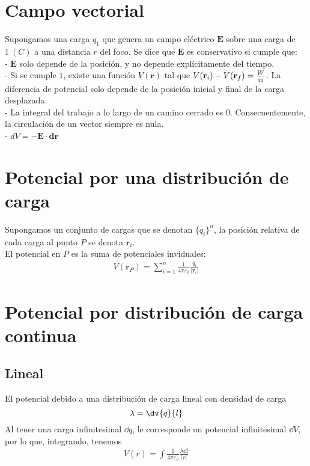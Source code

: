 \documentclass{./FisicaII.tex}
\begin{document}
\section{Campo vectorial}
Supongamos una carga $q_{1}$ que genera un campo eléctrico $\mathbf{E}$ sobre una carga de $1~(C)$ a una distancia $r$ del foco. Se dice que $\mathbf{E}$ es conservativo si cumple que:\\
- $\mathbf{E}$ solo depende de la posición, y no depende explícitamente del tiempo.\\
- Si se cumple $1$, existe una función $V(\mathbf{r})$ tal que $V(\mathbf{r}_{i})\\
- V(\mathbf{r}_{f})=\frac{W}{q_{2}}$. La diferencia de potencial solo depende de la posición inicial y final de la carga desplazada.\\
- La integral del trabajo a lo largo de un camino cerrado es $0$. Consecuentemente, la circulación de un vector siempre es nula.\\
- $dV=-\mathbf{E}\cdot \mathbf{dr}$
\section{Potencial por una distribución de carga}
Supongamos un conjunto de cargas que se denotan $\{ q_{i} \}^{n}$, la posición relativa de cada carga al punto $P$ se denota $\mathbf{r}_{i}$.\\
El potencial en $P$ es la suma de potenciales inviduales:
\begin{equation}
	\begin{split}
		V(\mathbf{r}_{P}) = \sum_{i=1}^{n} \frac{1}{4\pi \varepsilon_{0}}
		\frac{q_{i}}{|\mathbf{r}_{i}|}
	\end{split}
\end{equation}
\section{Potencial por distribución de carga continua}
\subsection{Lineal}
El potencial debido a una distribución de carga lineal con densidad de carga
\[
	\lambda = \dv{q}{l}
\]
Al tener una carga infinitesimal $\dd{q}$, le corresponde un potencial infinitesimal $\dd{V}$, por lo que, integrando, tenemos
\begin{equation}
	\begin{split}
		V(r) = \int \frac{1}{4\pi \varepsilon_{0}} \frac{\lambda \dd{l}}{|r|}
	\end{split}
\end{equation}
\end{document}
